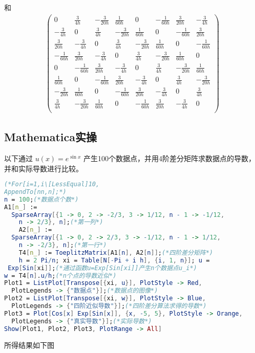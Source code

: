 和
\begin{equation}
\begin{aligned}
\left(
\begin{array}{cccccccc}
 0 & \frac{3}{4 h} & -\frac{3}{20 h} & \frac{1}{60 h} & 0 & -\frac{1}{60 h} & \frac{3}{20 h} & -\frac{3}{4 h} \\
 -\frac{3}{4 h} & 0 & \frac{3}{4 h} & -\frac{3}{20 h} & \frac{1}{60 h} & 0 & -\frac{1}{60 h} & \frac{3}{20 h} \\
 \frac{3}{20 h} & -\frac{3}{4 h} & 0 & \frac{3}{4 h} & -\frac{3}{20 h} & \frac{1}{60 h} & 0 & -\frac{1}{60 h} \\
 -\frac{1}{60 h} & \frac{3}{20 h} & -\frac{3}{4 h} & 0 & \frac{3}{4 h} & -\frac{3}{20 h} & \frac{1}{60 h} & 0 \\
 0 & -\frac{1}{60 h} & \frac{3}{20 h} & -\frac{3}{4 h} & 0 & \frac{3}{4 h} & -\frac{3}{20 h} & \frac{1}{60 h} \\
 \frac{1}{60 h} & 0 & -\frac{1}{60 h} & \frac{3}{20 h} & -\frac{3}{4 h} & 0 & \frac{3}{4 h} & -\frac{3}{20 h} \\
 -\frac{3}{20 h} & \frac{1}{60 h} & 0 & -\frac{1}{60 h} & \frac{3}{20 h} & -\frac{3}{4 h} & 0 & \frac{3}{4 h} \\
 \frac{3}{4 h} & -\frac{3}{20 h} & \frac{1}{60 h} & 0 & -\frac{1}{60 h} & \frac{3}{20 h} & -\frac{3}{4 h} & 0 \\
\end{array}
\right)
\end{aligned}~
\end{equation}

\subsection{Mathematica实操}
以下通过 $u(x)=e^{\sin x}$ 产生100个数据点，并用4阶差分矩阵求数据点的导数，并和实际导数进行比较。
\begin{lstlisting}[language=mathematica, caption=Mathematica利用四阶差分矩阵求导数，数据点由 $u(x)=e^{\sin x}$ 产生]
(*For[i=1,i\[LessEqual]10,
AppendTo[nn,n];*)
n = 100;(*数据点个数*)
A1[n_] := 
  SparseArray[{1 -> 0, 2 -> -2/3, 3 -> 1/12, n - 1 -> -1/12, 
    n -> 2/3}, n];(*第一列*)
	A2[n_] := 
  SparseArray[{1 -> 0, 2 -> 2/3, 3 -> -1/12, n - 1 -> 1/12, 
    n -> -2/3}, n];(*第一行*)
	T4[n_] := ToeplitzMatrix[A1[n], A2[n]];(*四阶差分矩阵*)
	h = 2 Pi/n; xi = Table[N[-Pi + i h], {i, 1, n}]; u = 
 Exp[Sin[xi]];(*通过函数u=Exp[Sin[xi]]产生n个数据点u_i*)
w = T4[n].u/h;(*n个点的导数近似*)
Plot1 = ListPlot[Transpose[{xi, u}], PlotStyle -> Red, 
  PlotLegends -> {"数据点"}];(*数据点的图像*)
Plot2 = ListPlot[Transpose[{xi, w}], PlotStyle -> Blue, 
  PlotLegends -> {"四阶近似导数"}];(*四阶差分算法求得的导数*)
Plot3 = Plot[Cos[x] Exp[Sin[x]], {x, -5, 5}, PlotStyle -> Orange, 
  PlotLegends -> {"真实导数"}];(*实际导数*)
Show[Plot1, Plot2, Plot3, PlotRange -> All]
\end{lstlisting}
所得结果如下图
